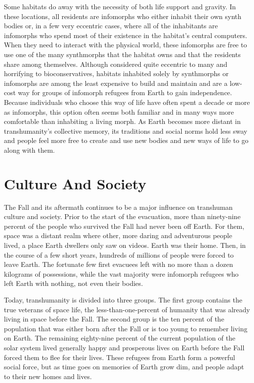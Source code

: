 Some habitats do away with the necessity of 
both life support and gravity. In these locations, all 
residents are infomorphs who either inhabit their own 
synth bodies or, in a few very eccentric cases, where 
all of the inhabitants are infomorphs who spend most 
of their existence in the habitat's central computers. 
When they need to interact with the physical world, 
these infomorphs are free to use one of the many 
synthmorphs that the habitat owns and that the residents share among themselves. Although considered 
quite eccentric to many and horrifying to bioconservatives, habitats inhabited solely by synthmorphs or 
infomorphs are among the least expensive to build 
and maintain and are a low-cost way for groups of 
infomorph refugees from Earth to gain independence. 
Because individuals who choose this way of life have 
often spent a decade or more as infomorphs, this 
option often seems both familiar and in many ways 
more comfortable than inhabiting a living morph. As 
Earth becomes more distant in transhumanity's collective memory, its traditions and social norms hold less 
sway and people feel more free to create and use new 
bodies and new ways of life to go along with them.

\section{Culture And Society}

The Fall and its aftermath continues to be a major 
influence on transhuman culture and society. Prior 
to the start of the evacuation, more than ninety-nine 
percent of the people who survived the Fall had never 
been off Earth. For them, space was a distant realm 
where other, more daring and adventurous people 
lived, a place Earth dwellers only saw on videos. Earth 
was their home. Then, in the course of a few short 
years, hundreds of millions of people were forced to 
leave Earth. The fortunate few first evacuees left with 
no more than a dozen kilograms of possessions, while 
the vast majority were infomorph refugees who left 
Earth with nothing, not even their bodies.

Today, transhumanity is divided into three groups. 
The first group contains the true veterans of space 
life, the less-than-one-percent of humanity that was 
already living in space before the Fall. The second 
group is the ten percent of the population that was 
either born after the Fall or is too young to remember 
living on Earth. The remaining eighty-nine percent of 
the current population of the solar system lived generally happy and prosperous lives on Earth before the 
Fall forced them to flee for their lives. These refugees 
from Earth form a powerful social force, but as time 
goes on memories of Earth grow dim, and people 
adapt to their new homes and lives.

